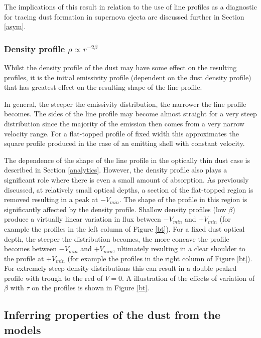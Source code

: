 \documentclass[useAMS,usenatbib,usegraphicx]{mnras}
\begin{document}
The implications of this result in relation to the use of line profiles as 
a diagnostic for tracing dust formation in supernova ejecta 
are discussed further in Section \ref{asym}.


\subsubsection{Density profile $\rho \propto r^{-2\beta}$}
\label{beta}

Whilst the density profile of the dust may have some effect on the 
resulting profiles, it is the initial emissivity profile (dependent on the 
dust density profile) that has greatest effect on the resulting shape of 
the line profile.

In general, the steeper the emissivity distribution, the narrower the line 
profile becomes.  The sides of the line profile may become almost straight 
for a very steep distribution since the majority of the emission then 
comes from a very narrow velocity range.  For a flat-topped profile of 
fixed width this approximates the square profile produced in the case of 
an emitting shell with constant velocity.

The dependence of the shape of the line profile in the optically thin dust case 
is described in Section \ref{analytics}.  However, the density profile 
also plays a significant role where there is even a small amount of 
absorption.  As previously discussed, at relatively small optical depths, 
a section of the flat-topped region is removed resulting in a peak at 
$-V_{min}$.  The shape of the profile in this region is significantly 
affected by the density profile.  Shallow density profiles (low $\beta$) produce a virtually 
linear variation in flux between $-V_{min}$ and $+V_{min}$ (for example the profiles in the left column of Figure \ref{bt}).  For a fixed dust
optical depth, the steeper the distribution becomes, the more concave the 
profile becomes between $-V_{min}$ and $+V_{min}$, ultimately resulting in 
a clear shoulder to the profile at $+V_{min}$  (for example the profiles in the right column of Figure \ref{bt}).  For extremely steep density
distributions this can result in a double peaked profile with 
trough to the red of $V=0$.  A illustration of the effects of variation of 
$\beta$ with $\tau$ on the profiles is shown in Figure \ref{bt}.

\subsection{Inferring properties of the dust from the models}
\end{document}
